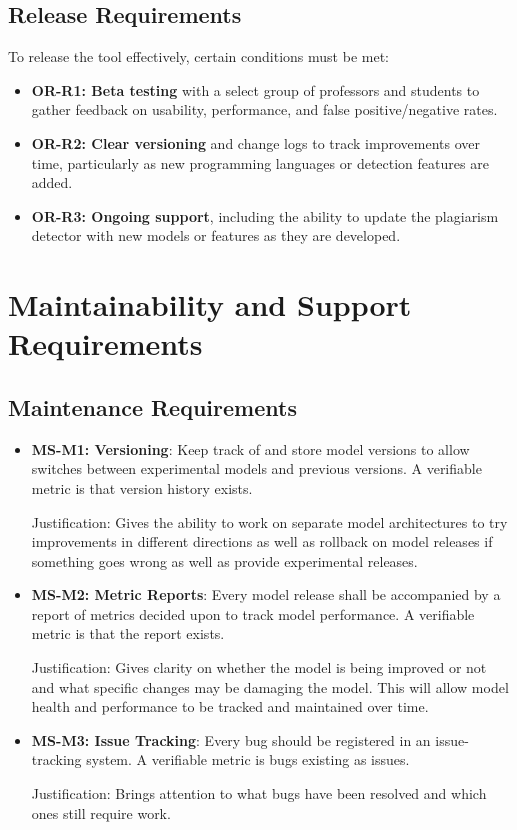 \documentclass[12pt]{article}
\begin{document}
\subsection{Release Requirements}
To release the tool effectively, certain conditions must be met:
\begin{itemize}
    \item \textbf{OR-R1: Beta testing} with a select group of professors and students to gather feedback on usability, performance, and false positive/negative rates.
    \item \textbf{OR-R2: Clear versioning} and change logs to track improvements over time, particularly as new programming languages or detection features are added.
    \item \textbf{OR-R3: Ongoing support}, including the ability to update the plagiarism detector with new models or features as they are developed.
\end{itemize}

\section{Maintainability and Support Requirements}
\subsection{Maintenance Requirements}
\begin{itemize}
    \item \textbf{MS-M1: Versioning}: Keep track of and store model versions to allow
     switches between experimental models and previous versions. A verifiable metric is 
     that version history exists.

    Justification: Gives the ability to work on separate model architectures to try 
    improvements in different directions as well as rollback on model releases 
    if something goes wrong as well as provide experimental releases.
    
    \item \textbf{MS-M2: Metric Reports}: Every model release shall be accompanied by 
    a report of metrics decided upon to track model performance. A verifiable metric is 
    that the report exists.

    Justification: Gives clarity on whether the model is being improved or not and what
     specific changes may be damaging the model. This will allow model health and 
     performance to be tracked and maintained over time.

    \item \textbf{MS-M3: Issue Tracking}: Every bug should be registered in an issue-tracking system. A verifiable metric is bugs existing as issues. 

    Justification: Brings attention to what bugs have been resolved and which 
    ones still require work.
    
\end{itemize}
\end{document}
